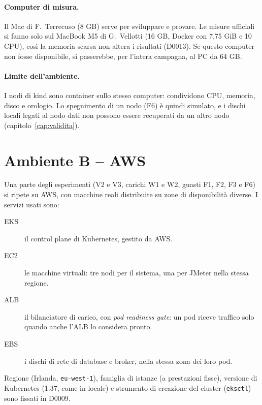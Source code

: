 \paragraph{Computer di misura.} Il Mac di F.~Terrecuso (8 GB) serve per sviluppare e provare. Le misure ufficiali si fanno solo sul MacBook M5 di G.~Vellotti (16 GB, Docker con 7,75 GiB e 10 CPU), così la memoria scarsa non altera i risultati (D0013). Se questo computer non fosse disponibile, si passerebbe, per l'intera campagna, al PC da 64 GB.

\paragraph{Limite dell'ambiente.} I nodi di kind sono container sullo stesso computer: condividono CPU, memoria, disco e orologio. Lo spegnimento di un nodo (F6) è quindi simulato, e i dischi locali legati al nodo dati non possono essere recuperati da un altro nodo (capitolo~\ref{cap:validita}).

\section{Ambiente B -- AWS}
\label{sec:aws}

Una parte degli esperimenti (V2 e V3, carichi W1 e W2, guasti F1, F2, F3 e F6) si ripete su AWS, con macchine reali distribuite su zone di disponibilità diverse. I servizi usati sono:

\begin{description}
  \item[EKS] il control plane di Kubernetes, gestito da AWS.
  \item[EC2] le macchine virtuali: tre nodi per il sistema, una per JMeter nella stessa regione.
  \item[ALB] il bilanciatore di carico, con \textit{pod readiness gate}: un pod riceve traffico solo quando anche l'ALB lo considera pronto.
  \item[EBS] i dischi di rete di database e broker, nella stessa zona dei loro pod.
\end{description}

Regione (Irlanda, \texttt{eu-west-1}), famiglia di istanze (a prestazioni fisse), versione di Kubernetes (1.37, come in locale) e strumento di creazione del cluster (\texttt{eksctl}) sono fissati in D0009.

